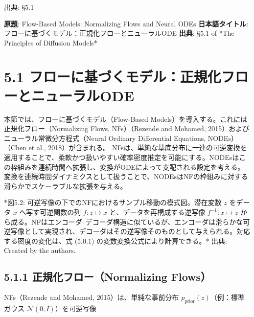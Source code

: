 

{\color{gray}\footnotesize 出典: §5.1\par}
\vspace{0.2em}
\begin{propositionbox}[原題]
\textbf{原題}: Flow-Based Models: Normalizing Flows and Neural ODEs
\textbf{日本語タイトル}: フローに基づくモデル：正規化フローとニューラルODE
\textbf{出典}: §5.1 of *The Principles of Diffusion Models*
\end{propositionbox}


\section*{5.1 フローに基づくモデル：正規化フローとニューラルODE}


本節では、フローに基づくモデル（Flow-Based Models）を導入する。これには正規化フロー（Normalizing Flows, NFs）（Rezende and Mohamed, 2015）およびニューラル常微分方程式（Neural Ordinary Differential Equations, NODEs）（Chen et al., 2018）が含まれる。
NFsは、単純な基底分布に一連の可逆変換を適用することで、柔軟かつ扱いやすい確率密度推定を可能にする。NODEsはこの枠組みを連続時間へ拡張し、変換がODEによって支配される設定を考える。変換を連続時間ダイナミクスとして扱うことで、NODEsはNFの枠組みに対する滑らかでスケーラブルな拡張を与える。



*図5.2: 可逆写像の下でのNFにおけるサンプル移動の模式図。潜在変数 $z$ をデータ $x$ へ写す可逆関数の列 $f: z \mapsto x$ と、データを再構成する逆写像 $f^{-1}: x \mapsto z$ から成る。NFはエンコーダ–デコーダ構造に似ているが、エンコーダは滑らかな可逆写像として実現され、デコーダはその逆写像そのものとして与えられる。対応する密度の変化は、式 (5.0.1) の変数変換公式により計算できる。*
出典: Created by the authors.

\subsection*{5.1.1 正規化フロー（Normalizing Flows）}


NFs（Rezende and Mohamed, 2015）は、単純な事前分布 $p_{\mathrm{prior}}(z)$（例：標準ガウス $\mathcal{N}(0, I)$）を可逆写像

